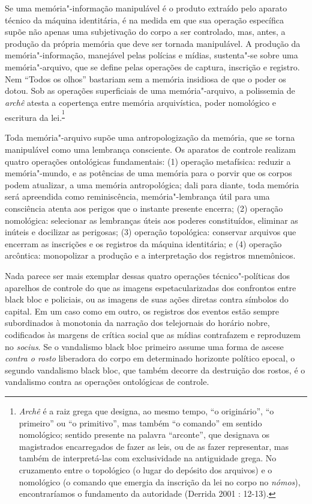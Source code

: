 Se uma memória"-informação manipulável é o produto extraído pelo aparato
técnico da máquina identitária, é na medida em que sua operação
específica supõe não apenas uma subjetivação do corpo a ser controlado,
mas, antes, a produção da própria memória que deve ser tornada
manipulável. A produção da memória"-informação, manejável pelas polícias
e mídias, sustenta"-se sobre uma memória"-arquivo, que se define pelas
operações de captura, inscrição e registro. Nem ``Todos os olhos''
bastariam sem a memória insidiosa de que o poder os dotou. Sob as
operações superficiais de uma memória"-arquivo, a polissemia de
\emph{archê} atesta a copertença entre memória arquivística, poder
nomológico e escritura da lei.\textsuperscript{\footnote{\emph{Archê }é
  a raiz grega que designa, ao mesmo tempo, ``o originário'', ``o
  primeiro'' ou ``o primitivo'', mas também ``o comando'' em sentido
  nomológico; sentido presente na palavra ``arconte'', que designava os
  magistrados encarregados de fazer as leis, ou de as fazer representar,
  mas também de interpretá-las com exclusividade na antiguidade grega.
  No cruzamento entre o topológico (o lugar do depósito dos arquivos) e
  o nomológico (o comando que emergia da inscrição da lei no corpo no
  \emph{nómos}), encontraríamos o fundamento da autoridade (Derrida 2001
  : 12-13).}}

Toda memória"-arquivo supõe uma antropologização da memória, que se torna
manipulável como uma lembrança consciente. Os aparatos de controle
realizam quatro operações ontológicas fundamentais: (1) operação
metafísica: reduzir a memória"-mundo, e as potências de uma memória para
o porvir que os corpos podem atualizar, a uma memória antropológica;
dali para diante, toda memória será apreendida como reminiscência,
memória"-lembrança útil para uma consciência atenta aos perigos que o
instante presente encerra; (2) operação nomológica: selecionar as
lembranças úteis aos poderes constituídos, eliminar as inúteis e
docilizar as perigosas; (3) operação topológica: conservar arquivos que
encerram as inscrições e os registros da máquina identitária; e (4)
operação arcôntica: monopolizar a produção e a interpretação dos
registros mnemônicos.

Nada parece ser mais exemplar dessas quatro operações técnico"-políticas
dos aparelhos de controle do que as imagens espetacularizadas dos
confrontos entre black bloc e policiais, ou as imagens de suas ações
diretas contra símbolos do capital. Em um caso como em outro, os
registros dos eventos estão sempre subordinados à monotonia da narração
dos telejornais do horário nobre, codificados às margens de crítica
social que as mídias contrafazem e reproduzem no \emph{socius}. Se o
vandalismo black bloc primeiro assume uma forma de ascese \emph{contra o
rosto} liberadora do corpo em determinado horizonte político epocal, o
segundo vandalismo black bloc, que também decorre da destruição dos
rostos, é o vandalismo contra as operações ontológicas de controle.

